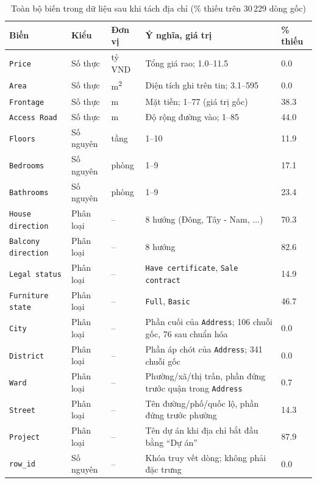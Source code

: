 \documentclass[11pt]{article}
\newcommand{\ty}{tỷ VND}
\newcommand{\mtwo}{m\textsuperscript{2}}
\begin{document}
\begin{table}[H]
\centering
\small
\caption{Toàn bộ biến trong dữ liệu sau khi tách địa chỉ (\% thiếu trên 30\,229 dòng gốc)}
\begin{tabular}{@{}L{0.18\textwidth}L{0.11\textwidth}L{0.09\textwidth}L{0.38\textwidth}L{0.10\textwidth}@{}}
\toprule
\textbf{Biến} & \textbf{Kiểu} & \textbf{Đơn vị} & \textbf{Ý nghĩa, giá trị} & \textbf{\% thiếu} \\
\midrule
\texttt{Price} & Số thực & \ty & Tổng giá rao; 1.0--11.5 & 0.0 \\
\texttt{Area} & Số thực & \mtwo & Diện tích ghi trên tin; 3.1--595 & 0.0 \\
\texttt{Frontage} & Số thực & m & Mặt tiền; 1--77 (giá trị gốc) & 38.3 \\
\texttt{Access Road} & Số thực & m & Độ rộng đường vào; 1--85 & 44.0 \\
\texttt{Floors} & Số nguyên & tầng & 1--10 & 11.9 \\
\texttt{Bedrooms} & Số nguyên & phòng & 1--9 & 17.1 \\
\texttt{Bathrooms} & Số nguyên & phòng & 1--9 & 23.4 \\
\texttt{House direction} & Phân loại & -- & 8 hướng (Đông, Tây - Nam, ...) & 70.3 \\
\texttt{Balcony direction} & Phân loại & -- & 8 hướng & 82.6 \\
\texttt{Legal status} & Phân loại & -- & \texttt{Have certificate}, \texttt{Sale contract} & 14.9 \\
\texttt{Furniture state} & Phân loại & -- & \texttt{Full}, \texttt{Basic} & 46.7 \\
\texttt{City} & Phân loại & -- & Phần cuối của \texttt{Address}; 106 chuỗi gốc, 76 sau chuẩn hóa & 0.0 \\
\texttt{District} & Phân loại & -- & Phần áp chót của \texttt{Address}; 341 chuỗi gốc & 0.0 \\
\texttt{Ward} & Phân loại & -- & Phường/xã/thị trấn, phần đứng trước quận trong \texttt{Address} & 0.7 \\
\texttt{Street} & Phân loại & -- & Tên đường/phố/quốc lộ, phần đứng trước phường & 14.3 \\
\texttt{Project} & Phân loại & -- & Tên dự án khi địa chỉ bắt đầu bằng ``Dự án'' & 87.9 \\
\texttt{row\_id} & Số nguyên & -- & Khóa truy vết dòng; không phải đặc trưng & 0.0 \\
\bottomrule
\end{tabular}
\end{table}
\end{document}
